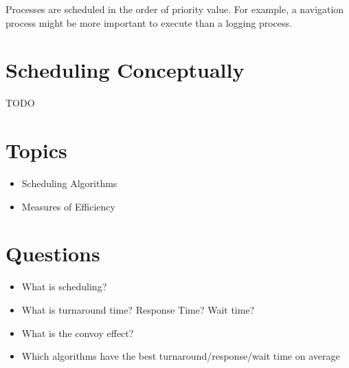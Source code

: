 Processes are scheduled in the order of priority value. For example, a navigation process might be more important to execute than a logging process.


\section{Scheduling Conceptually}

TODO

\section{Topics}

\begin{itemize}
\tightlist
\item
  Scheduling Algorithms
\item
  Measures of Efficiency
\end{itemize}

\section{Questions}

\begin{itemize}
\tightlist
\item
  What is scheduling?
\item
  What is turnaround time? Response Time? Wait time?
\item
  What is the convoy effect?
\item
  Which algorithms have the best turnaround/response/wait time on average
\end{itemize}



